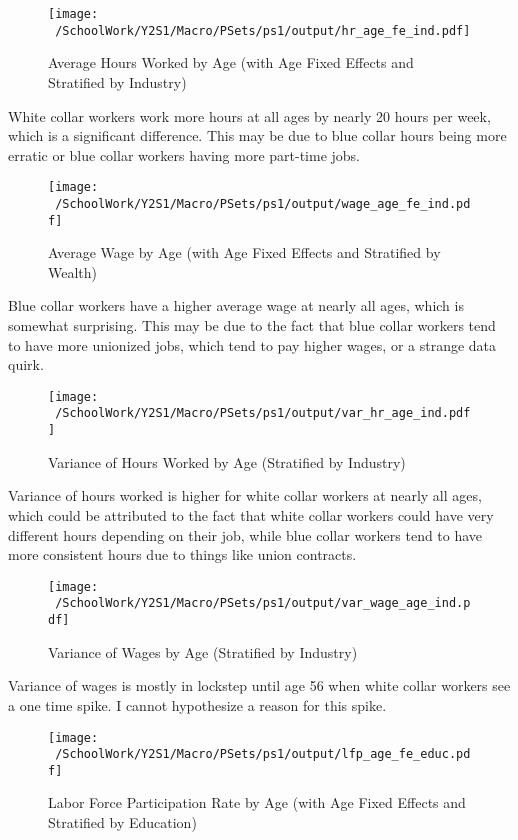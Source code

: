 \documentclass[12pt]{article}
\begin{document}
\begin{figure}[h!]
    \centering
    \texttt{[image: ~/SchoolWork/Y2S1/Macro/PSets/ps1/output/hr\_age\_fe\_ind.pdf]}
    \caption{Average Hours Worked by Age (with Age Fixed Effects and Stratified by Industry)}
\end{figure}

White collar workers work more hours at all ages by nearly 20 hours per week, which is a significant difference.
This may be due to blue collar hours being more erratic or blue collar workers having more part-time jobs.

\begin{figure}[h!]
    \centering
    \texttt{[image: ~/SchoolWork/Y2S1/Macro/PSets/ps1/output/wage\_age\_fe\_ind.pdf]}
    \caption{Average Wage by Age (with Age Fixed Effects and Stratified by Wealth)}
\end{figure}

Blue collar workers have a higher average wage at nearly all ages, which is somewhat surprising. This may be due
to the fact that blue collar workers tend to have more unionized jobs, which tend to pay higher wages, or a strange
data quirk.

\begin{figure}[h!]
    \centering
    \texttt{[image: ~/SchoolWork/Y2S1/Macro/PSets/ps1/output/var\_hr\_age\_ind.pdf]}
    \caption{Variance of Hours Worked by Age (Stratified by Industry)}
\end{figure}

Variance of hours worked is higher for white collar workers at nearly all ages, which could be attributed to the fact
that white collar workers could have very different hours depending on their job, while blue collar workers tend to have more
consistent hours due to things like union contracts.

\begin{figure}[h!]
    \centering
    \texttt{[image: ~/SchoolWork/Y2S1/Macro/PSets/ps1/output/var\_wage\_age\_ind.pdf]}
    \caption{Variance of Wages by Age (Stratified by Industry)}
\end{figure}

Variance of wages is mostly in lockstep until age 56 when white collar workers see a one time spike. I cannot hypothesize a
reason for this spike.

\begin{figure}[h!]
    \centering
    \texttt{[image: ~/SchoolWork/Y2S1/Macro/PSets/ps1/output/lfp\_age\_fe\_educ.pdf]}
    \caption{Labor Force Participation Rate by Age (with Age Fixed Effects and Stratified by Education)}
\end{figure}
\end{document}
